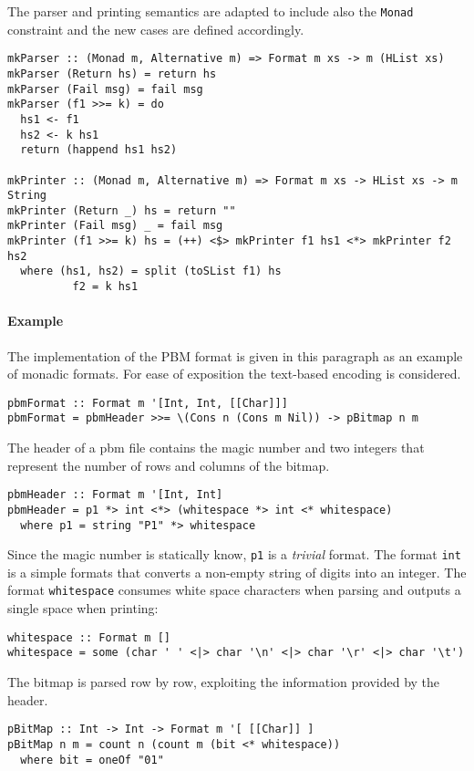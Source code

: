 \documentclass[../Thesis.tex]{subfiles}
\begin{document}
The parser and printing semantics are adapted to include also the \texttt{Monad} constraint and the new cases are defined accordingly.
\begin{verbatim}
mkParser :: (Monad m, Alternative m) => Format m xs -> m (HList xs)
mkParser (Return hs) = return hs
mkParser (Fail msg) = fail msg
mkParser (f1 >>= k) = do
  hs1 <- f1
  hs2 <- k hs1
  return (happend hs1 hs2)

mkPrinter :: (Monad m, Alternative m) => Format m xs -> HList xs -> m String
mkPrinter (Return _) hs = return ""
mkPrinter (Fail msg) _ = fail msg
mkPrinter (f1 >>= k) hs = (++) <$> mkPrinter f1 hs1 <*> mkPrinter f2 hs2
  where (hs1, hs2) = split (toSList f1) hs
          f2 = k hs1 
\end{verbatim}

\paragraph{Example}
The implementation of the PBM format is given in this paragraph
as an example of monadic formats.
For ease of exposition the text-based encoding is considered.

\begin{verbatim}
pbmFormat :: Format m '[Int, Int, [[Char]]]
pbmFormat = pbmHeader >>= \(Cons n (Cons m Nil)) -> pBitmap n m
\end{verbatim}

The header of a pbm file contains the magic number and two integers that represent the number of rows and columns of the bitmap.
	
\begin{verbatim}
pbmHeader :: Format m '[Int, Int]
pbmHeader = p1 *> int <*> (whitespace *> int <* whitespace)
  where p1 = string "P1" *> whitespace 
\end{verbatim}

Since the magic number is statically know, \texttt{p1} is a \emph{trivial} 
format.
The format \texttt{int} is a simple formats that converts a non-empty string of digits into an integer.
The format \texttt{whitespace} consumes white space characters when 
parsing and outputs a single space when printing:
\begin{verbatim}
whitespace :: Format m []
whitespace = some (char ' ' <|> char '\n' <|> char '\r' <|> char '\t')
\end{verbatim}

The bitmap is parsed row by row, exploiting the information provided by the header.
\begin{verbatim}
pBitMap :: Int -> Int -> Format m '[ [[Char]] ]
pBitMap n m = count n (count m (bit <* whitespace))
  where bit = oneOf "01"
\end{verbatim}
\end{document}
